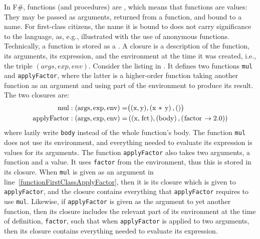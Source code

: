 \documentclass[fsharpNotes.tex]{subfiles}
\begin{document}
In F\#, functions (and procedures) are , which means that functions are values: They may be passed as arguments, returned from a function, and bound to a name. For first-class citizens, the name it is bound to does not carry significance to the language, as, e.g., illustrated with the use of anonymous functions. Technically, a function is stored as a . A closure is a description of the function, its arguments, its expression, and the environment at the time it was created, i.e., the triple $(args, exp, env)$. Consider the listing in .
%
%
It defines two functions \lstinline{mul} and \lstinline{applyFactor}, where the latter is a higher-order function taking another function as an argument and using part of the environment to produce its result. The two closures are:
\begin{align}
  \text{\lstinline{mul}}: \left(\text{args}, \text{exp}, \text{env}\right) 
  = &\big((\text{\lstinline{x}},\text{\lstinline{y}}), \left(\text{\lstinline{x * y}}\right), ()\big)
  \\\text{\lstinline{applyFactor}}: \left(\text{args}, \text{exp}, \text{env}\right) 
  = &\left((\text{\lstinline{x}}, \text{\lstinline{fct}}), \left(\text{\lstinline{body}}\right),\left(\text{\lstinline{factor}} \rightarrow 2.0\right)\right)
\end{align}
where lazily write \lstinline{body} instead of the whole function's body.  The function \lstinline{mul} does not use its environment, and everything needed to evaluate its expression is values for its arguments. The function \lstinline{applyFactor} also takes two arguments, a function and a value. It uses \lstinline{factor} from the environment, thus this is stored in its closure. When \lstinline{mul} is given as an argument in  line~\ref{functionFirstClassApplyFactor}, then it is its closure which is given to \lstinline{applyFactor}, and the closure contains everything that \lstinline{applyFactor} requires to use \lstinline{mul}. Likewise, if \lstinline{applyFactor} is given as the argument to yet another function, then its closure includes the relevant part of its environment at the time of definition, \lstinline{factor}, such that when \lstinline{applyFactor} is applied to two arguments, then its closure contains everything needed to evaluate its expression.
\end{document}
